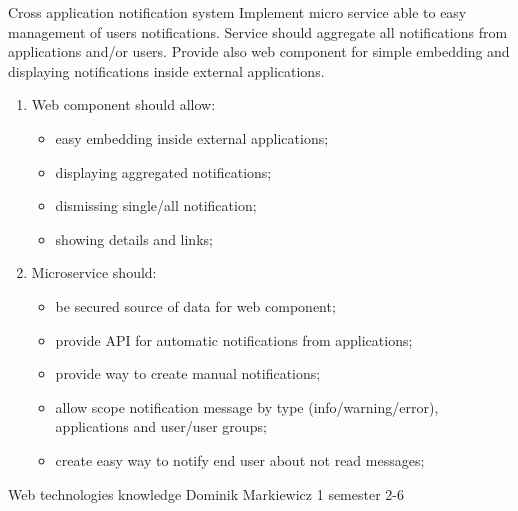 \begin{project}
{Cross application notification system}
{Implement micro service able to easy management of users notifications. Service should aggregate all notifications from applications and/or users. Provide also web component for simple embedding and displaying notifications inside external applications.} 
{
\begin{enumerate}
	\item Web component should allow:
		\begin{itemize}
			\item easy embedding inside external applications;
			\item displaying aggregated notifications;
			\item dismissing single/all notification;
			\item showing details and links;
		\end{itemize}
	\item Microservice should:
		\begin{itemize}
			\item be secured source of data for web component;
			\item provide API for automatic notifications from applications;
			\item provide way to create manual notifications;
			\item allow scope notification message by type (info/warning/error), applications and user/user groups;
			\item create easy way to notify end user about not read messages;
		\end{itemize}
\end{enumerate}
}
{Web technologies knowledge}
{Dominik Markiewicz}
{1 semester}
{2-6}
\end{project}
